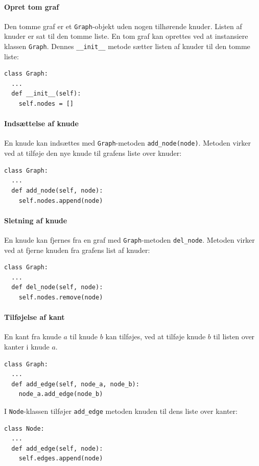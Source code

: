 \documentclass[10pt,a4paper,danish]{article}
\newcommand{\ct}{\texttt}
\begin{document}
\paragraph{Opret tom graf}
Den tomme graf er et \ct{Graph}-objekt uden nogen tilhørende
knuder. Listen af knuder er sat til den tomme liste. En tom graf kan
oprettes ved at instansiere klassen \ct{Graph}. Dennes \ct{\_\_init\_\_}
metode sætter listen af knuder til den tomme liste:
{\small
\begin{verbatim}
class Graph:
  ...
  def __init__(self):
    self.nodes = []
\end{verbatim}}

\paragraph{Indsættelse af knude}
En knude kan indsættes med \ct{Graph}-metoden
\ct{add\_node(node)}. Metoden virker ved at tilføje den nye knude til
grafens liste over knuder:
{\small
\begin{verbatim}
class Graph:
  ...
  def add_node(self, node):
    self.nodes.append(node)
\end{verbatim}}

\paragraph{Sletning af knude}
En knude kan fjernes fra en graf med \ct{Graph}-metoden
\ct{del\_node}. Metoden virker ved at fjerne knuden fra grafens list af
knuder:
{\small
\begin{verbatim}
class Graph:
  ...
  def del_node(self, node):
    self.nodes.remove(node)
\end{verbatim}}

\paragraph{Tilføjelse af kant}
En kant fra knude $a$ til knude $b$ kan tilføjes, ved at tilføje knude
$b$ til listen over kanter i knude $a$.

{\small
\begin{verbatim}
class Graph:
  ...
  def add_edge(self, node_a, node_b):
    node_a.add_edge(node_b)
\end{verbatim}}

I \ct{Node}-klassen tilføjer \ct{add\_edge} metoden knuden til dens
liste over kanter:
{\small
\begin{verbatim}
class Node:
  ...
  def add_edge(self, node):
    self.edges.append(node)
\end{verbatim}}
\end{document}
